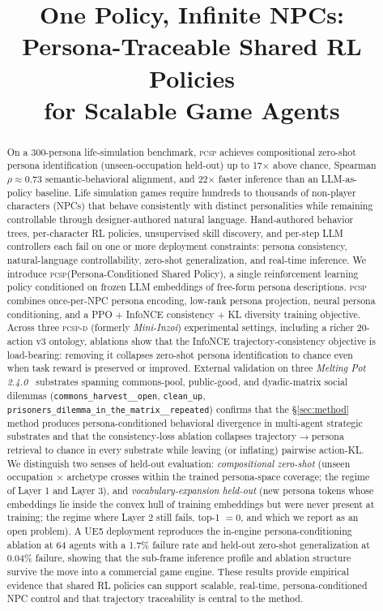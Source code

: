 \documentclass[conference]{IEEEtran}
\title{One Policy, Infinite NPCs:\\
Persona-Traceable Shared RL Policies\\
for Scalable Game Agents}
\author{%
  \IEEEauthorblockN{Yoosung Hong\thanks{Project page: \url{https://github.com/yoosunghong/pcsp}.}}
  \IEEEauthorblockA{Independent Researcher\\
    \url{yoosunghong.main@gmail.com}}
}
\newcommand{\PCSP}{\textsc{pcsp}\xspace}
\newcommand{\PCSPD}{\textsc{pcsp-d}\xspace}
\begin{document}
\maketitle

\begin{abstract}
On a 300-persona life-simulation benchmark, \PCSP achieves compositional
zero-shot persona identification (unseen-occupation held-out) up to
17$\times$ above chance, Spearman $\rho\!\approx\!0.73$ semantic-behavioral
alignment, and 22$\times$ faster inference than an LLM-as-policy baseline. Life simulation games require hundreds to thousands of
non-player characters (NPCs) that behave consistently with distinct personalities
while remaining controllable through designer-authored natural language.
Hand-authored behavior trees, per-character RL policies, unsupervised skill
discovery, and per-step LLM controllers each fail on one or more deployment
constraints: persona consistency, natural-language controllability, zero-shot
generalization, and real-time inference.
We introduce \PCSP (Persona-Conditioned Shared Policy), a single reinforcement
learning policy conditioned on frozen LLM embeddings of free-form persona
descriptions. \PCSP combines once-per-NPC persona encoding, low-rank persona
projection, neural persona conditioning, and a PPO + InfoNCE consistency + KL
diversity training objective. Across three \PCSPD{} (formerly \textit{Mini-Inzoi}) experimental settings,
including a richer 20-action v3 ontology, ablations show that the InfoNCE
trajectory-consistency objective is load-bearing: removing it collapses
zero-shot persona identification to chance even when task reward is preserved or
improved. External validation on three \textit{Melting Pot
2.4.0}~\cite{leibo2021meltingpot} substrates spanning commons-pool, public-good,
and dyadic-matrix social dilemmas (\texttt{commons\_harvest\_\_open},
\texttt{clean\_up}, \texttt{prisoners\_dilemma\_in\_the\_matrix\_\_repeated})
confirms that the \S\ref{sec:method} method produces persona-conditioned
behavioral divergence in multi-agent strategic substrates and that the
consistency-loss ablation collapses trajectory$\to$persona retrieval to chance
in every substrate while leaving (or inflating) pairwise action-KL.
We distinguish two senses of held-out evaluation: \emph{compositional zero-shot}
(unseen occupation $\times$ archetype crosses within the trained
persona-space coverage; the regime of Layer 1 and Layer 3), and
\emph{vocabulary-expansion held-out} (new persona tokens whose embeddings
lie inside the convex hull of training embeddings but were never present at
training; the regime where Layer 2 still fails, top-1 $=0$, and which we
report as an open problem). A UE5
deployment reproduces the in-engine persona-conditioning ablation at 64 agents
with a 1.7\% failure rate and held-out zero-shot generalization at 0.04\%
failure, showing that the sub-frame inference profile and ablation structure
survive the move into a commercial game engine. These results provide empirical
evidence that shared RL policies can support scalable, real-time,
persona-conditioned NPC control and that trajectory traceability is central to
the method.
\end{abstract}
\end{document}
